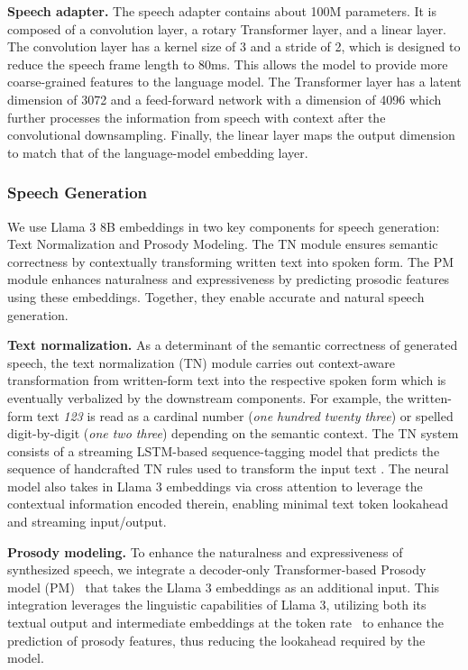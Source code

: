 \textbf{Speech adapter.} The speech adapter contains about 100M parameters. It is composed of a convolution layer, a rotary Transformer layer, and a linear layer. The convolution layer has a kernel size of 3 and a stride of 2, which is designed to  reduce the speech frame length to 80ms. This allows the model to provide more coarse-grained features to the language model. The Transformer layer has a latent dimension of 3072 and a feed-forward network with a dimension of 4096 which further processes the information from speech with context after the convolutional downsampling. Finally, the linear layer maps the output dimension to match that of the language-model embedding layer.

\subsubsection{Speech Generation}

We use Llama 3 8B embeddings in two key components for speech generation: Text Normalization and Prosody Modeling. The TN module ensures semantic correctness by contextually transforming written text into spoken form. The PM module enhances naturalness and expressiveness by predicting prosodic features using these embeddings. Together, they enable accurate and natural speech generation.

\textbf{Text normalization.} As a determinant of the semantic correctness of generated speech, the text normalization (TN) module carries out context-aware transformation from written-form text into the respective spoken form which is eventually verbalized by the downstream components. For example, the written-form text \emph{123} is read as a cardinal number (\emph{one hundred twenty three}) or spelled digit-by-digit (\emph{one two three}) depending on the semantic context. The TN system consists of a streaming LSTM-based sequence-tagging model that predicts the sequence of handcrafted TN rules used to transform the input text \citep{kang2024tn}. The neural model also takes in Llama 3 embeddings via cross attention to leverage the contextual information encoded therein, enabling minimal text token lookahead and streaming input/output.

\textbf{Prosody modeling.}
\label{sec:tts:pm}
To enhance the naturalness and expressiveness of synthesized speech, we integrate a decoder-only Transformer-based Prosody model (PM)~\citep{radford2021learning} that takes the Llama 3 embeddings as an additional input. This integration leverages the linguistic capabilities of Llama 3, utilizing both its textual output and intermediate embeddings at the token rate~\citep{devlin2018bert, dong2019unified, raffel2020exploring, guo2023prompttts} to enhance the prediction of prosody features, thus reducing the lookahead required by the model.

